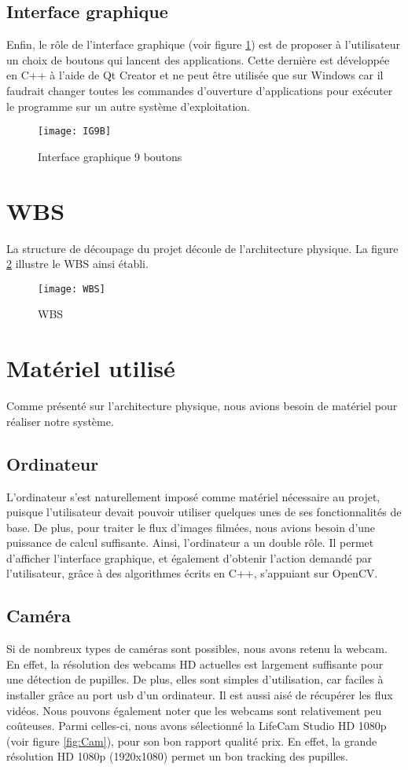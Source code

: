 \subsection{Interface graphique}
Enfin, le rôle de l'interface graphique (voir figure \ref{fig:IG9B2}) est de proposer à l'utilisateur un choix de boutons qui lancent des applications. Cette dernière est développée en C++ à l'aide de Qt Creator et ne peut être utilisée que sur Windows car il faudrait changer toutes les commandes d'ouverture d'applications pour exécuter le programme sur un autre système d'exploitation.

\begin{figure}[H]
  \centering
  \texttt{[image: IG9B]}
  \caption{Interface graphique 9 boutons}
  \label{fig:IG9B2}
\end{figure}

\section{WBS}
La structure de découpage du projet découle de l'architecture physique. La figure \ref{fig:WBS} illustre le WBS ainsi établi. 

\begin{figure}[H]
  \centering
  \texttt{[image: WBS]}
  \caption{WBS}
  \label{fig:WBS}
\end{figure}

\section{Matériel utilisé}

Comme présenté sur l'architecture physique, nous avions besoin de matériel pour réaliser notre système.

\subsection{Ordinateur}
L'ordinateur s'est naturellement imposé comme matériel nécessaire au projet, puisque l'utilisateur devait pouvoir utiliser quelques unes de ses fonctionnalités de base. De plus, pour traiter le flux d'images filmées, nous avions besoin d'une puissance de calcul suffisante. Ainsi, l'ordinateur a un double rôle. Il permet d'afficher l'interface graphique, et également d'obtenir l'action demandé par l'utilisateur, grâce à des algorithmes écrits en C++, s'appuiant sur OpenCV. 

\subsection{Caméra}
Si de nombreux types de caméras sont possibles, nous avons retenu la webcam. En effet, la résolution des webcams HD actuelles est largement suffisante pour une détection de pupilles. De plus, elles sont simples d'utilisation, car faciles à installer grâce au port usb d'un ordinateur. Il est aussi aisé de récupérer les flux vidéos. Nous pouvons également noter que les webcams sont relativement peu coûteuses.
Parmi celles-ci, nous avons sélectionné la LifeCam Studio HD 1080p (voir figure \ref{fig:Cam}), pour son bon rapport qualité prix. En effet, la grande résolution HD 1080p (1920x1080) permet un bon tracking des pupilles.

